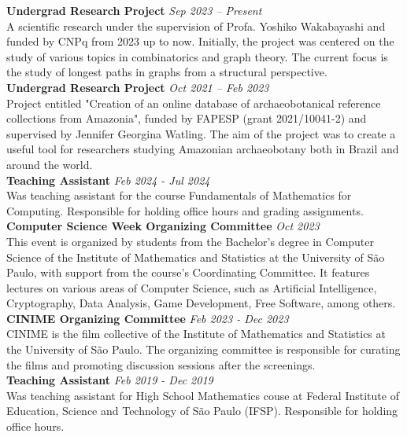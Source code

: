 \documentclass[a4paper,10pt]{article}
\begin{document}
\noindent\textbf{Undergrad Research Project}  \hfill  \textit{Sep 2023 -- Present} \\
A scientific research under the supervision of Profa. Yoshiko Wakabayashi and funded by CNPq from 2023
up to now. Initially, the project was centered on the study of various topics in combinatorics and graph theory. The current focus is the study of longest paths in graphs from a structural perspective. \\

\noindent\textbf{Undergrad Research Project}  \hfill  \textit{Oct 2021 -- Feb 2023} \\
Project entitled "Creation of an online database of archaeobotanical reference collections from Amazonia", funded by FAPESP (grant 2021/10041-2) and supervised by Jennifer Georgina Watling. The aim of the project was to create a useful tool for researchers studying Amazonian archaeobotany both in Brazil and around the world. \\ 

\noindent\textbf{Teaching Assistant}  \hfill  \textit{Feb 2024 - Jul 2024}\\
Was teaching assistant for the course Fundamentals of Mathematics for Computing.
Responsible for holding office hours and grading assignments. \\

\noindent\textbf{Computer Science Week Organizing Committee} \hfill  \textit{Oct 2023}\\
This event is organized by students from the Bachelor’s degree in Computer Science of the Institute of Mathematics and Statistics at the University of São Paulo, with support from the course's Coordinating Committee. It features lectures on various areas of Computer Science, such as Artificial Intelligence, Cryptography, Data Analysis, Game Development, Free Software, among others. \\

\noindent\textbf{CINIME Organizing Committee} \hfill  \textit{Feb 2023 - Dec 2023}\\
CINIME is the film collective of the Institute of Mathematics and Statistics at the University of São Paulo. The organizing committee is responsible for curating the films and promoting discussion sessions after the screenings. \\

\noindent\textbf{Teaching Assistant} \hfill  \textit{Feb 2019 - Dec 2019}\\
Was teaching assistant for High School Mathematics couse at  Federal Institute of Education, Science and Technology of São Paulo (IFSP). Responsible for holding office hours. \\
\end{document}
